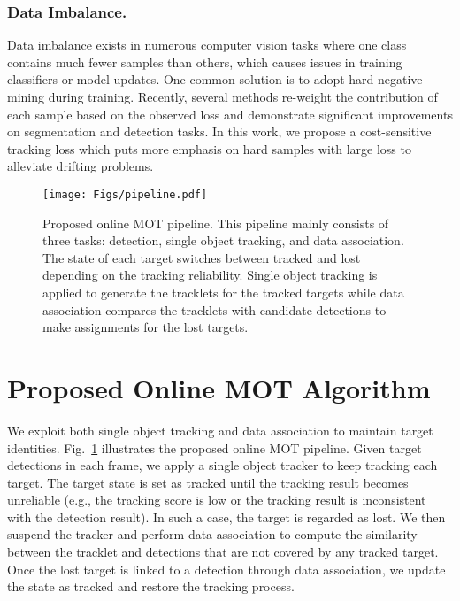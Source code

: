 \documentclass[runningheads]{llncs}
\begin{document}
\subsubsection{Data Imbalance.}
  Data imbalance exists in numerous computer vision tasks where one class contains much fewer samples than others, which causes issues in training classifiers or model updates. 
One common solution \cite{felzenszwalb2010cascade,shrivastava2016training} is to adopt hard negative mining during training. 
Recently, several methods \cite{bulo2017loss,focal_loss} re-weight the contribution of each sample based on the observed loss 
  and demonstrate significant improvements on segmentation and detection tasks. 
In this work, we propose a cost-sensitive tracking loss which puts 
  more emphasis on hard samples with large loss to alleviate drifting problems.
\begin{figure}[t]
    \centering
    \texttt{[image: Figs/pipeline.pdf]}\\
    \caption{Proposed online MOT pipeline. This pipeline mainly consists of three tasks: detection, single object tracking, and data association. The state of each target switches between tracked and lost depending on the tracking reliability. Single object tracking is applied to generate the tracklets for the tracked targets while data association compares the tracklets with candidate detections to make assignments for the lost targets.}
  \label{fig:framework}
  \end{figure}
  
  \section{Proposed Online MOT Algorithm}
  We exploit both single object tracking and data association to maintain target identities. Fig.~\ref{fig:framework} illustrates the proposed online MOT pipeline.
Given target detections in each frame, we apply a single object tracker to keep tracking each target. 
The target state is set as tracked until the tracking result becomes unreliable (e.g., the tracking score is low or the tracking result is inconsistent with the detection result).
In such a case, the target is regarded as lost. 
We then suspend the tracker and perform data association to compute the similarity between the tracklet and detections that are not covered by any tracked target. 
Once the lost target is linked to a detection through data association, we update the state as tracked and restore the tracking process.
  
\end{document}
